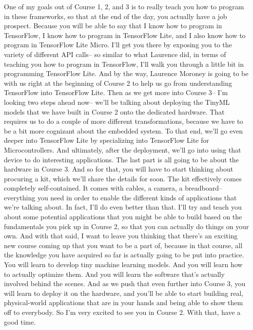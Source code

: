 One of my goals out of Course 1, 2, and 3
is to really teach you how to program in these frameworks,
so that at the end of the day, you actually have a job prospect.
Because you will be able to say that I know how to program in TensorFlow,
I know how to program in TensorFlow Lite,
and I also know how to program in TensorFlow Lite Micro.
I'll get you there by exposing you to the variety of different API calls--
so similar to what Laurence did, in terms of teaching you
how to program in TensorFlow, I'll walk you
through a little bit in programming TensorFlow Lite.
And by the way, Laurence Moroney is going
to be with us right at the beginning of Course 2
to help us go from understanding TensorFlow into TensorFlow Lite.
Then as we get more into Course 3--
I'm looking two steps ahead now-- we'll be
talking about deploying the TinyML models that we have built in Course 2
onto the dedicated hardware.
That requires us to do a couple of more different transformations,
because we have to be a bit more cognizant about the embedded system.
To that end, we'll go even deeper into TensorFlow Lite
by specializing into TensorFlow Lite for Microcontrollers.
And ultimately, after the deployment, we'll
go into using that device to do interesting applications.
The last part is all going to be about the hardware in Course 3.
And so for that, you will have to start thinking about procuring a kit, which
we'll share the details for soon.
The kit effectively comes completely self-contained.
It comes with cables, a camera, a breadboard-- everything
you need in order to enable the different kinds of applications
that we're talking about.
In fact, I'll do even better than that.
I'll try and teach you about some potential applications
that you might be able to build based on the fundamentals
you pick up in Course 2, so that you can actually do things on your own.
And with that said, I want to leave you thinking
that there's an exciting new course coming up
that you want to be a part of, because in that course,
all the knowledge you have acquired so far
is actually going to be put into practice.
You will learn to develop tiny machine learning models.
And you will learn how to actually optimize them.
And you will learn the software that's actually involved behind the scenes.
And as we push that even further into Course 3,
you will learn to deploy it on the hardware,
and you'll be able to start building real, physical-world applications that
are in your hands and being able to show them off to everybody.
So I'm very excited to see you in Course 2.
With that, have a good time.

